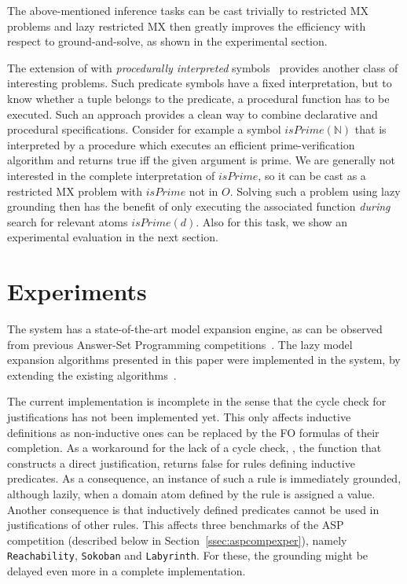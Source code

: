 \documentclass[11pt]{article}
\newcommand{\m}[1]{\ensuremath{#1}\xspace}
\newcommand{\nat}{\m{\mathbb{N}}}
\newcommand{\logicname}[1]{\text{\sc #1}\xspace}
\newcommand{\idp}{\logicname{IDP}}
\newcommand{\foid}{\logicname{FO(\ensuremath{ID})}}
\theoremstyle{plain}
\theoremstyle{definition}
\theoremstyle{example_basic}
\theoremstyle{example_contd}
\theoremstyle{plain}
\newcommand{\reach}				{\texttt{Reachability}\xspace}
\newcommand{\sokoban}			{\texttt{Sokoban}\xspace}
\newcommand{\labyrinth}			{\texttt{Labyrinth}\xspace}
\newcommand{\change}[1]{#1}
\begin{document}
The above-mentioned inference tasks can be cast trivially to restricted MX problems and lazy restricted MX then greatly improves the efficiency with respect to ground-and-solve, as shown in the experimental section.

The extension of \foid with \emph{procedurally interpreted} symbols~\cite{WarrenBook/DeCatBBD14} provides another class of interesting problems. Such predicate symbols have a fixed interpretation, but to know whether a tuple belongs to the predicate, a procedural function has to be executed.  Such an approach provides a clean way to combine declarative and procedural specifications. Consider for example a symbol $isPrime(\nat)$ that is interpreted by a procedure which executes an efficient prime-verification algorithm and returns true iff the given argument is prime. We are generally not interested in the complete interpretation of $isPrime$, so it can be cast as a restricted MX problem with $isPrime$ not in $O$.  Solving such a problem using lazy grounding then has the benefit of only executing the associated function \emph{during} search for relevant atoms $isPrime(d)$. Also for this task, we show an experimental evaluation in the next section.

\newcommand{\tout}{\texttt{T}}

\newcommand{\mout}{\texttt{M}}
\newcommand{\gs}{\texttt{g\&s}}

\section{Experiments}\label{sec:experiments}
The \idp system has a state-of-the-art model expansion engine, as can
be observed from previous Answer-Set Programming competitions~. The lazy model expansion algorithms presented in this paper were implemented in the \idp system, by extending the existing algorithms~\cite{ictai/DeCat13}.

\change{The current implementation is incomplete in the sense that the
  cycle check for justifications has not been implemented yet. This only
  affects inductive definitions as non-inductive ones can be replaced
  by the FO formulas of their completion. As a workaround for the lack
  of a cycle check, \buildconstr, the function that constructs a
  direct justification, returns false for rules defining
  inductive predicates. As a consequence, an instance of such a rule
  is immediately grounded, although lazily, when a domain atom defined
  by the rule is assigned a value. Another consequence is that inductively defined   predicates cannot be used in justifications of other rules. This affects three benchmarks of the ASP competition (described below in Section~\ref{ssec:aspcompexper}), namely \reach, \sokoban and \labyrinth. For these, the grounding might be delayed even more in a complete implementation.}
\end{document}
